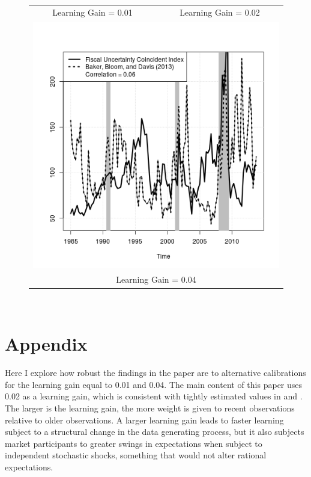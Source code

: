 \documentclass[11pt]{article}
\newcommand{\citee}[1]{\citet{#1}}
\begin{document}
\begin{figure}
\begin{tabular}{cc}
Learning Gain = 0.01 & Learning Gain = 0.02 \\ 
\multicolumn{2}{c}{\includegraphics[scale=0.5]{./results/pics0.04/fpuindex.png}} \\
\multicolumn{2}{c}{Learning Gain = 0.04} 
\end{tabular}
\end{figure} 

\ \newpage
\appendix
\section{Appendix} 

Here I explore how robust the findings in the paper are to alternative calibrations for the learning gain equal to 0.01 and 0.04.  The main content of this paper uses 0.02 as a learning gain, which is consistent with tightly estimated values in \citee{milani2007} and \citee{slobodyan_wouters_2012}.  The larger is the learning gain, the more weight is given to recent observations relative to older observations.  A larger learning gain leads to faster learning subject to a structural change in the data generating process, but it also subjects market participants to greater swings in expectations when subject to independent stochastic shocks, something that would not alter rational expectations.  
\end{document}
